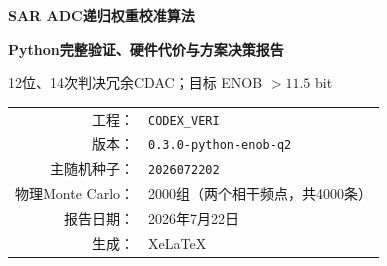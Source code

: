 \documentclass[UTF8,fontset=windows,a4paper,10.5pt]{ctexart}
\begin{document}
\begin{titlepage}\centering
\vspace*{2.0cm}
{\Huge\bfseries SAR ADC递归权重校准算法\par}\vspace{0.4cm}
{\LARGE\bfseries Python完整验证、硬件代价与方案决策报告\par}\vspace{1.2cm}
{\large 12位、14次判决冗余CDAC；目标 ENOB $>11.5$ bit\par}\vspace{1.5cm}
\begin{tabular}{rl}
工程：& \texttt{CODEX\_VERI}\\
版本：& \texttt{0.3.0-python-enob-q2}\\
主随机种子：& \texttt{2026072202}\\
物理Monte Carlo：& 2000组（两个相干频点，共4000条）\\
报告日期：& 2026年7月22日\\
生成：& XeLaTeX\\
\end{tabular}
\vfill
{}
\vfill
\end{titlepage}
\tableofcontents\clearpage
\end{document}
